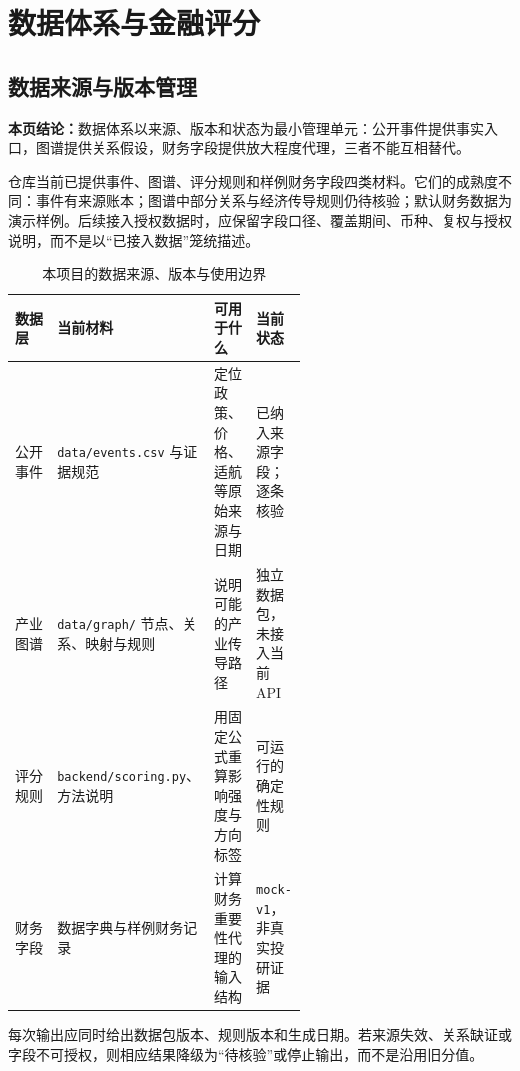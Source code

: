 \clearpage
\section{数据体系与金融评分}
\subsection*{数据来源与版本管理}\label{page:21}
\fi

\textbf{本页结论：}数据体系以来源、版本和状态为最小管理单元：公开事件提供事实入口，图谱提供关系假设，财务字段提供放大程度代理，三者不能互相替代。

仓库当前已提供事件、图谱、评分规则和样例财务字段四类材料。它们的成熟度不同：事件有来源账本；图谱中部分关系与经济传导规则仍待核验；默认财务数据为演示样例。后续接入授权数据时，应保留字段口径、覆盖期间、币种、复权与授权说明，而不是以“已接入数据”笼统描述。

\begin{table}[htbp]
\centering
\caption{本项目的数据来源、版本与使用边界}
\label{tab:wty-data-version}
\small
\begin{tabularx}{\linewidth}{p{0.19\linewidth}p{0.21\linewidth}X p{0.18\linewidth}}
\toprule
数据层 & 当前材料 & 可用于什么 & 当前状态 \\
\midrule
公开事件 & \texttt{data/events.csv} 与证据规范 & 定位政策、价格、适航等原始来源与日期 & 已纳入来源字段；逐条核验 \\
产业图谱 & \texttt{data/graph/} 节点、关系、映射与规则 & 说明可能的产业传导路径 & 独立数据包，未接入当前 API \\
评分规则 & \texttt{backend/scoring.py}、方法说明 & 用固定公式重算影响强度与方向标签 & 可运行的确定性规则 \\
财务字段 & 数据字典与样例财务记录 & 计算财务重要性代理的输入结构 & \texttt{mock-v1}，非真实投研证据 \\
\bottomrule
\end{tabularx}
\end{table}

每次输出应同时给出数据包版本、规则版本和生成日期。若来源失效、关系缺证或字段不可授权，则相应结果降级为“待核验”或停止输出，而不是沿用旧分值。
